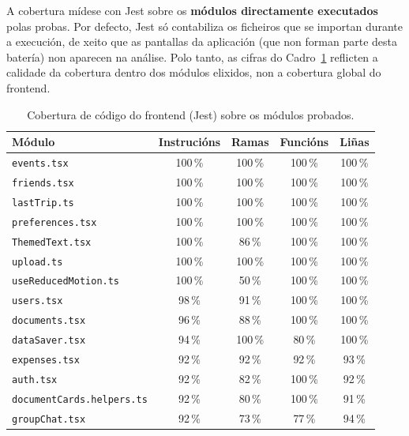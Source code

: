 A cobertura mídese con Jest sobre os \textbf{módulos directamente executados} polas
probas. Por defecto, Jest só contabiliza os ficheiros que se importan durante a execución,
de xeito que as pantallas da aplicación (que non forman parte desta batería) non aparecen
na análise. Polo tanto, as cifras do Cadro~\ref{tab:cobertura-frontend} reflicten a
calidade da cobertura dentro dos módulos elixidos, non a cobertura global do frontend.

\begin{table}[H]
  \caption{Cobertura de código do frontend (Jest) sobre os módulos probados.}
  \label{tab:cobertura-frontend}
  \centering
  \begin{tabularx}{\textwidth}{@{}Xcccc@{}}
    \toprule
    \textbf{Módulo} & \textbf{Instrucións} & \textbf{Ramas} & \textbf{Funcións} & \textbf{Liñas} \\
    \midrule
    \texttt{events.tsx}               & 100\,\% & 100\,\% & 100\,\% & 100\,\% \\
    \texttt{friends.tsx}              & 100\,\% & 100\,\% & 100\,\% & 100\,\% \\
    \texttt{lastTrip.ts}              & 100\,\% & 100\,\% & 100\,\% & 100\,\% \\
    \texttt{preferences.tsx}          & 100\,\% & 100\,\% & 100\,\% & 100\,\% \\
    \texttt{ThemedText.tsx}           & 100\,\% &  86\,\% & 100\,\% & 100\,\% \\
    \texttt{upload.ts}                & 100\,\% & 100\,\% & 100\,\% & 100\,\% \\
    \texttt{useReducedMotion.ts}      & 100\,\% &  50\,\% & 100\,\% & 100\,\% \\
    \texttt{users.tsx}                &  98\,\% &  91\,\% & 100\,\% & 100\,\% \\
    \texttt{documents.tsx}            &  96\,\% &  88\,\% & 100\,\% & 100\,\% \\
    \texttt{dataSaver.tsx}            &  94\,\% & 100\,\% &  80\,\% & 100\,\% \\
    \texttt{expenses.tsx}             &  92\,\% &  92\,\% &  92\,\% &  93\,\% \\
    \texttt{auth.tsx}                 &  92\,\% &  82\,\% & 100\,\% &  92\,\% \\
    \texttt{documentCards.helpers.ts} &  92\,\% &  80\,\% & 100\,\% &  91\,\% \\
    \texttt{groupChat.tsx}            &  92\,\% &  73\,\% &  77\,\% &  94\,\% \\

\end{tabularx}
\end{table}
